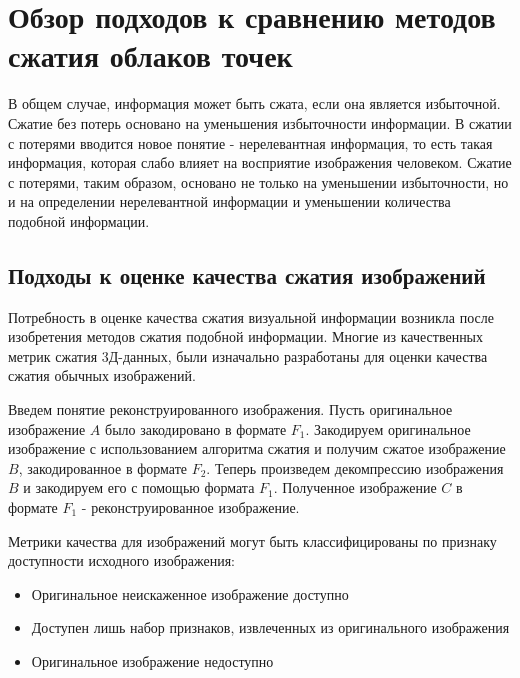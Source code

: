 \newpage
\chapter{Обзор подходов к сравнению методов сжатия облаков точек}


В общем случае, информация может быть сжата, если она является избыточной.
Сжатие без потерь основано на уменьшения избыточности информации. В сжатии с
потерями вводится новое понятие - нерелевантная информация, то есть такая
информация, которая слабо влияет на восприятие изображения человеком. Сжатие с
потерями, таким образом, основано не только на уменьшении избыточности, но и на
определении нерелевантной информации и уменьшении количества подобной
информации\cite[265]{DataCompression}.

\section{Подходы к оценке качества сжатия изображений}


Потребность в оценке качества сжатия визуальной информации возникла после
изобретения методов сжатия подобной информации. Многие из качественных метрик
сжатия 3Д-данных, были изначально разработаны для оценки качества сжатия обычных
изображений.

Введем понятие реконструированного изображения. Пусть оригинальное изображение
$A$ было закодировано в формате $F_{1}$. Закодируем оригинальное изображение с
использованием алгоритма сжатия и получим сжатое изображение $B$, закодированное
в формате $F_{2}$. Теперь произведем декомпрессию изображения $B$ и закодируем
его с помощью формата $F_{1}$. Полученное изображение $C$ в формате $F_{1}$ -
реконструированное изображение.

Метрики качества для изображений могут быть классифицированы по признаку
доступности исходного изображения\cite{SSIMArticle}:

\begin{itemize}
    \item Оригинальное неискаженное изображение доступно
    \item Доступен лишь набор признаков, извлеченных из оригинального изображения
    \item Оригинальное изображение недоступно
\end{itemize}

